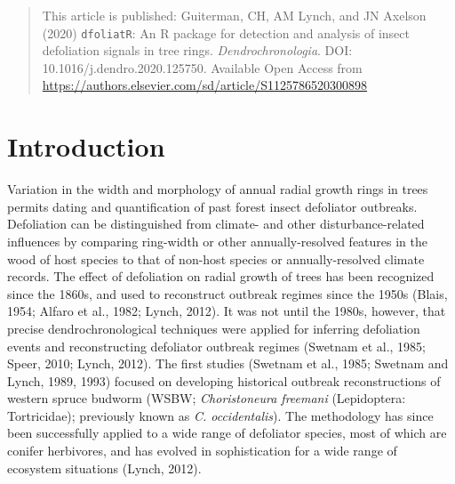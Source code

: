 \documentclass[review]{elsarticle} %
\begin{document}
\begin{quote}
This article is published: Guiterman, CH, AM Lynch, and JN Axelson (2020) \texttt{dfoliatR}: An R package for detection and analysis of insect defoliation signals in tree rings. \emph{Dendrochronologia}. DOI: 10.1016/j.dendro.2020.125750.
Available Open Access from \url{https://authors.elsevier.com/sd/article/S1125786520300898}
\end{quote}

\hypertarget{introduction}{%
\section{Introduction}\label{introduction}}

Variation in the width and morphology of annual radial growth rings in trees permits dating and quantification of past forest insect defoliator outbreaks. Defoliation can be distinguished from climate- and other disturbance-related influences by comparing ring-width or other annually-resolved features in the wood of host species to that of non-host species or annually-resolved climate records. The effect of defoliation on radial growth of trees has been recognized since the 1860s, and used to reconstruct outbreak regimes since the 1950s (Blais, 1954; Alfaro et al., 1982; Lynch, 2012). It was not until the 1980s, however, that precise dendrochronological techniques were applied for inferring defoliation events and reconstructing defoliator outbreak regimes (Swetnam et al., 1985; Speer, 2010; Lynch, 2012). The first studies (Swetnam et al., 1985; Swetnam and Lynch, 1989, 1993) focused on developing historical outbreak reconstructions of western spruce budworm (WSBW; \emph{Choristoneura freemani} (Lepidoptera: Tortricidae); previously known as \emph{C. occidentalis}). The methodology has since been successfully applied to a wide range of defoliator species, most of which are conifer herbivores, and has evolved in sophistication for a wide range of ecosystem situations (Lynch, 2012).
\end{document}
